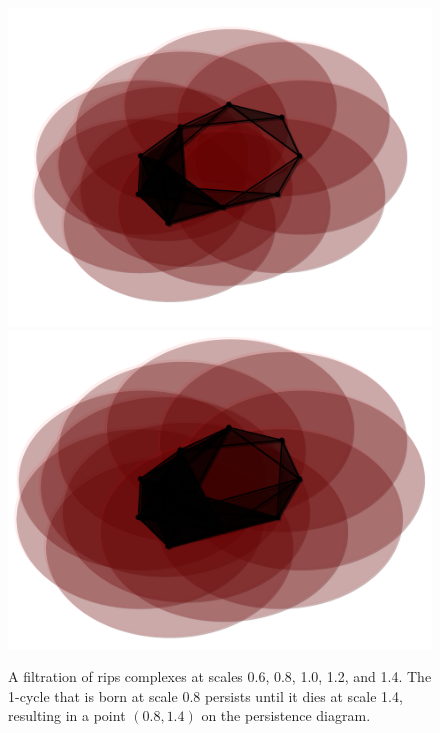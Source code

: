 \begin{figure}[htbp]
    \includegraphics[scale=0.4]{figures/persist12.pdf}
    \includegraphics[scale=0.4]{figures/persist14.pdf}
    \caption{A filtration of rips complexes at scales 0.6, 0.8, 1.0, 1.2, and 1.4.
            The 1-cycle that is born at scale 0.8 persists until it dies at scale 1.4,
            resulting in a point $(0.8, 1.4)$ on the persistence diagram.}
    \label{fig:persist}
\end{figure}

